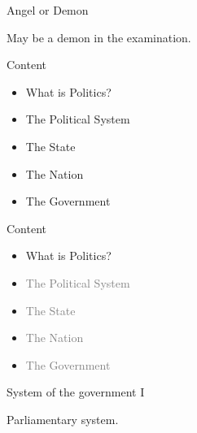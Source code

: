 \documentclass{beamer}
\begin{document}
\begin{frame}{Angel or Demon}
\begin{minipage}{0.4\textwidth}
\begin{center}
\end{center}
\begin{center}
May be a demon in the examination.
\end{center}
\end{minipage}
\end{frame}
\begin{frame}{Content}
\begin{itemize}
\item What is Politics?
\item The Political System
\item The State
\item The Nation
\item The Government
\end{itemize}
\end{frame}
\begin{frame}{Content}
\begin{itemize}
\item What is Politics?
\item \textcolor{gray}{The Political System}
\item \textcolor{gray}{The State}
\item \textcolor{gray}{The Nation}
\item \textcolor{gray}{The Government}
\end{itemize}
\end{frame}
\begin{frame}{System of the government I}
\begin{center}
\end{center}
\begin{center}
Parliamentary system.
\end{center}
\end{frame}
\end{document}
